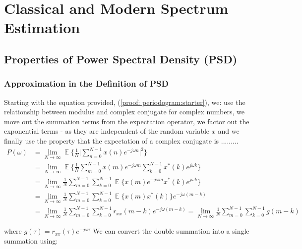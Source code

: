 \documentclass[12pt]{article}
\date{April 2019}
\DeclareMathOperator*{\E}{\mathbb{E}}
\begin{document}


\newpage
\tableofcontents

\newpage
\section{Classical and Modern Spectrum Estimation}
	\subsection{Properties of Power Spectral Density (PSD)} \label{sec: 1-1-prop-PSD}
	
	\subsubsection{Approximation in the Definition of PSD} \label{sec: 1-1a-prop-PSD}
	Starting with the equation provided, (\ref{proof: periodogram:starter}), we: use the relationship between modulus and complex conjugate for complex numbers, we move out the summation terms from the expectation operator, we factor out the exponential terms - as they are independent of the random variable $x$ and we finally use the property that the expectation of a complex conjugate is .........
	\begin{align}
		P(\omega)   & =\lim_{N\to\infty} \E \bigg\{ \frac{1}{N} \bigg| \sum_{n=0}^{N-1} x(n) e^{-j\omega n} \bigg|^{2} \bigg\}
		\label{proof: periodogram:starter}\\
		& = \lim_{N\to\infty} \E \bigg\{\frac{1}{N}
		\sum_{m=0}^{N-1} x(m) e^{-j\omega m} \sum_{k=0}^{N-1} x^{*}(k) e^{j\omega k} \bigg\}\nonumber\\
		& = \lim_{N\to\infty} \frac{1}{N}
		\sum_{m=0}^{N-1} \sum_{k=0}^{N-1} \E \bigg\{ x(m) e^{-j\omega m} x^{*}(k) e^{j\omega k} \bigg\}\nonumber\\
		& = \lim_{N\to\infty} \frac{1}{N}
		\sum_{m=0}^{N-1} \sum_{k=0}^{N-1} \E \bigg\{ x(m) x^{*}(k) \bigg\} e^{-j\omega(m-k)} \nonumber\\
		& = \lim_{N\to\infty} \frac{1}{N}
		\sum_{m=0}^{N-1} \sum_{k=0}^{N-1} r_{xx}(m-k) e^{-j\omega(m-k)}
		= \lim_{N\to\infty} \frac{1}{N}
		\sum_{m=0}^{N-1} \sum_{k=0}^{N-1} g(m-k)
		\label{proof: periodogram}
	\end{align}
	
	where $g(\tau) = r_{xx}(\tau) e^{-j\omega\tau}$
	\newline
	We can convert the double summation into a single summation using:
	
\end{document}
